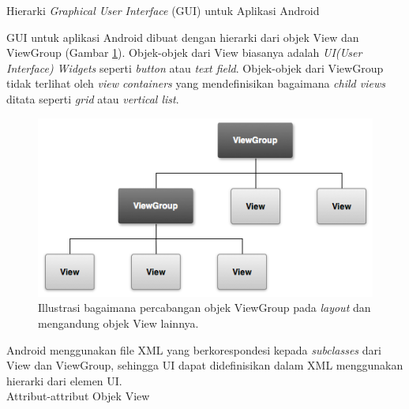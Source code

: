\documentclass[a4paper,twoside]{article}
\begin{document}
\begin{enumerate}
	 Hierarki \textit{Graphical User Interface} (GUI) untuk Aplikasi Android\\
		\label{sssec:hierarki_gui_untuk_aplikasi_android}
		
		GUI untuk aplikasi Android dibuat dengan hierarki dari objek View dan ViewGroup (Gambar \ref{fig:viewgroup}). Objek-objek dari View biasanya adalah \textit{UI(User Interface) Widgets} seperti \textit{button} atau \textit{text field}. Objek-objek dari ViewGroup tidak terlihat oleh \textit{view containers} yang mendefinisikan bagaimana \textit{child views} ditata seperti \textit{grid} atau \textit{vertical list}.

		\begin{figure}[htbp]
			\centering
				\includegraphics[scale=1]{Gambar/viewgroup.png}
			\caption{Illustrasi bagaimana percabangan objek ViewGroup pada \textit{layout} dan mengandung objek View lainnya.}
			\label{fig:viewgroup}
		\end{figure}

		Android menggunakan file XML yang berkorespondesi kepada \textit{subclasses} dari View dan ViewGroup, sehingga UI dapat didefinisikan dalam XML menggunakan hierarki dari elemen UI.\\

 Attribut-attribut Objek View\\


\end{enumerate}
\end{document}
